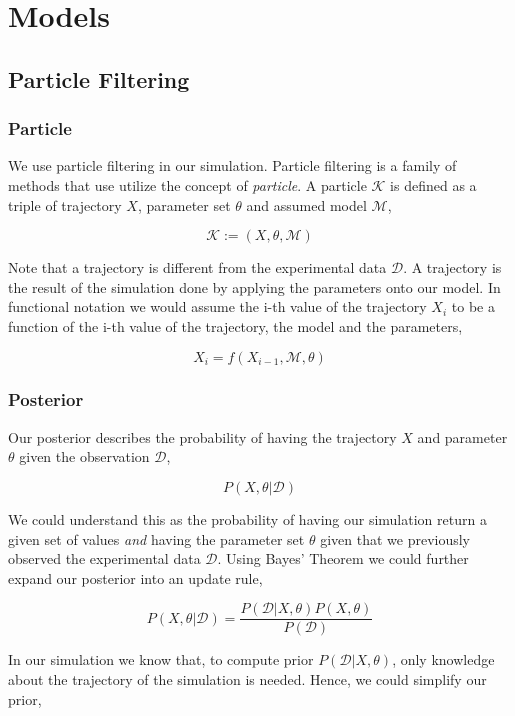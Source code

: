 \documentclass[12pt, oneside]{article}
\begin{document}
\section{Models}

\subsection{Particle Filtering}

\subsubsection{Particle}

We use particle filtering in our simulation. Particle filtering is a family of methods that use utilize the concept of \textit{particle}. A particle $\mathcal{K}$ is defined as a triple of trajectory $X$, parameter set $\theta$ and assumed model $\mathcal{M}$,

$$
\mathcal{K} := (X, \theta, \mathcal{M})
$$

Note that a trajectory is different from the experimental data $\mathcal{D}$. A trajectory is the result of the simulation done by applying the parameters onto our model. In functional notation we would assume the i-th value of the trajectory $X_i$ to be a function of the i-th value of the trajectory, the model and the parameters,

$$
X_i = f(X_{i - 1}, \mathcal{M}, \theta)
$$

\subsubsection{Posterior}

Our posterior describes the probability of having the trajectory $X$ and parameter $\theta$ given the observation $\mathcal{D}$,

$$
P(X, \theta | \mathcal{D})
$$

We could understand this as the probability of having our simulation return a given set of values \textit{and} having the parameter set $\theta$ given that we previously observed the experimental data $\mathcal{D}$. Using Bayes' Theorem we could further expand our posterior into an update rule,

$$
P(X, \theta | \mathcal{D}) = \frac{P(\mathcal{D} | X, \theta)  P(X, \theta)}{P(\mathcal{D})}
$$

In our simulation we know that, to compute prior $P(\mathcal{D} | X, \theta)$, only knowledge about the trajectory of the simulation is needed. Hence, we could simplify our prior,
\end{document}
